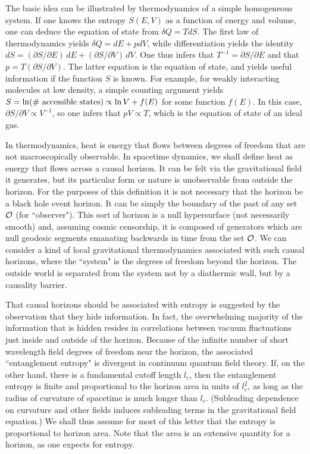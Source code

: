 \documentclass[12pt]{article}
\begin{document}
The basic idea can be illustrated by thermodynamics
of a simple homogeneous system. If one knows the entropy
$S(E,V)$ as a function of energy and volume,
one can deduce the equation of state from
$\delta Q=T dS$. The first law of thermodynamics
yields $\delta Q=dE+pdV$, while differentiation yields
the identity
$dS=(\partial S/\partial E)\, dE + (\partial S/\partial V)\, dV$.
One thus infers that $T^{-1}=\partial S/\partial E$ and
that $p=T(\partial S/\partial V)$. The latter equation is the
equation of state, and yields useful information if the
function $S$ is known. For example, for weakly interacting
molecules at low density, a simple counting argument yields
$S=\ln(\# {\rm ~accessible~states})\propto \ln V + f(E)$ for some
function $f(E)$. In this case, $\partial S/\partial V\propto V^{-1}$,
so one infers that $pV\propto T$, which is the equation of state
of an ideal gas.

In thermodynamics, heat is energy that flows between degrees
of freedom that are not macroscopically observable.
In spacetime dynamics, we shall define
heat as energy that flows across a causal horizon. It can be felt
via the gravitational field it generates, but its particular form
or nature is unobservable from outside the horizon.
For the purposes of this definition
it is not necessary that the horizon be a black hole event
horizon. It can be simply the boundary of the past of any
set ${\cal O}$  (for ``observer").
This sort of horizon is a null hypersurface
(not necessarily smooth) and, assuming cosmic censorship, it is
composed of generators which are
null geodesic segments emanating backwards in time
from the set ${\cal O}$.
We can consider a kind of local gravitational
thermodynamics associated with such causal
horizons, where the ``system"
is the degrees of freedom beyond the horizon.
The outside world is separated from the system not by a
diathermic wall, but by a causality barrier.

That causal horizons should be associated with entropy is suggested
by the observation that they hide information\cite{bek}.
In fact, the overwhelming majority of the
information that is hidden resides
in correlations between vacuum fluctuations just inside and outside
of the horizon\cite{tangle}.
Because of the infinite number of short wavelength field degrees of
freedom near the horizon, the associated ``entanglement entropy" is divergent
in continuum quantum field theory. If, on the other hand, there is a
fundamental cutoff length $l_c$, then the entanglement entropy
is finite and proportional to the horizon area in units of $l_c^2$,
as long as the radius
of curvature of spacetime is much longer than $l_c$.
(Subleading dependence on curvature
and other fields induces subleading terms in the gravitational
field equation.)
We shall thus assume for most of this letter
that the entropy is proportional to horizon area.
Note that the area is an extensive quantity for a horizon,
as one expects for entropy\cite{holo}.
\end{document}
